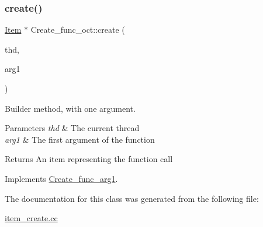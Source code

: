 \subsubsection{\texorpdfstring{create()}{create()}}
{\footnotesize\ttfamily \mbox{\hyperlink{classItem}{Item}} $\ast$ Create\+\_\+func\+\_\+oct\+::create (\begin{DoxyParamCaption}\item[{T\+HD $\ast$}]{thd,  }\item[{\mbox{\hyperlink{classItem}{Item}} $\ast$}]{arg1 }\end{DoxyParamCaption})\hspace{0.3cm}{\ttfamily [virtual]}}

Builder method, with one argument. 
\begin{DoxyParams}{Parameters}
{\em thd} & The current thread \\
\hline
{\em arg1} & The first argument of the function \\
\hline
\end{DoxyParams}
\begin{DoxyReturn}{Returns}
An item representing the function call 
\end{DoxyReturn}


Implements \mbox{\hyperlink{classCreate__func__arg1_a3e9a98f755cd82c3e762e334c955a8c9}{Create\+\_\+func\+\_\+arg1}}.



The documentation for this class was generated from the following file\+:\begin{DoxyCompactItemize}
\item 
\mbox{\hyperlink{item__create_8cc}{item\+\_\+create.\+cc}}\end{DoxyCompactItemize}
